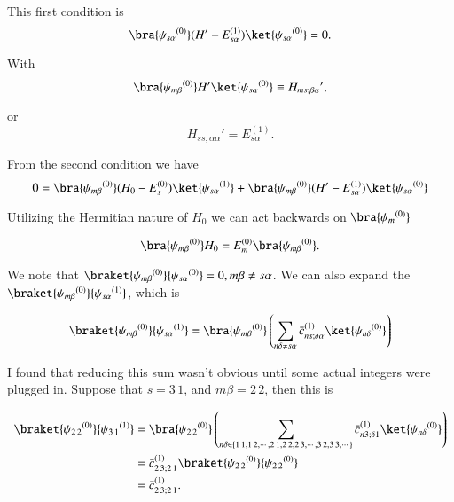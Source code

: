 This first condition is
\begin{equation}\label{eqn:qmTwoL5a:480}
\bra{{\psi_{s \alpha}}^{(0)}} (H' - E_{s \alpha}^{(1)}) \ket{{\psi_{s \alpha}}^{(0)}} = 0.
\end{equation}

With
\begin{equation}\label{eqn:qmTwoL5a:500}
\bra{{\psi_{m \beta}}^{(0)}} H' \ket{{\psi_{s \alpha}}^{(0)}} \equiv {H_{ms ; \beta \alpha}}',
\end{equation}

or
\begin{equation}\label{eqn:qmTwoL5a:520}
{H_{ss ; \alpha \alpha}}' = E_{s \alpha}^{(1)}.
\end{equation}

From the second condition we have
\begin{equation}\label{eqn:qmTwoL5a:540}
0 = \bra{{\psi_{m \beta}}^{(0)}} 
(H_0 - E_s^{(0)}) \ket{{\psi_{s \alpha}}^{(1)}} 
+\bra{{\psi_{m \beta}}^{(0)}} 
(H' - E_{s \alpha}^{(1)}) \ket{{\psi_{s \alpha}}^{(0)}} 
\end{equation}

Utilizing the Hermitian nature of $H_0$ we can act backwards on $\bra{{\psi_m}^{(0)}}$ 

\begin{equation}\label{eqn:qmTwoL5a:560}
\bra{{\psi_{m \beta}}^{(0)}} H_0
=
E_m^{(0)} \bra{{\psi_{m \beta}}^{(0)}}.
\end{equation}

We note that $\braket{{\psi_{m \beta}}^{(0)}}{{\psi_{s \alpha}}^{(0)}} = 0, m \beta \ne s \alpha$.  We can also expand the $\braket{{\psi_{m \beta}}^{(0)}}{{\psi_{s \alpha}}^{(1)}}$, which is

\begin{align*}
\braket{{\psi_{m \beta}}^{(0)}}{{\psi_{s \alpha}}^{(1)}} 
&=
\bra{{\psi_{m \beta}}^{(0)}}
\left(
\sum_{n\delta \ne s\alpha} {\bar{c}_{ns;\delta \alpha}}^{(1)} \ket{{\psi_{n \delta}}^{(0)}}
\right) \\
\end{align*}

I found that reducing this sum wasn't obvious until some actual integers were plugged in.  Suppose that $s = 3\,1$, and $m \beta = 2\,2$, then this is

\begin{align*}
\braket{{\psi_{2\,2}}^{(0)}}{{\psi_{3\,1}}^{(1)}} 
&=
\bra{{\psi_{2\,2}}^{(0)}}
\left(
\sum_{n \delta \in \{1\,1, 1\,2, \cdots, 2\,1, 2\,2, 2\,3, \cdots, 3\,2, 3\,3, \cdots \} } {\bar{c}_{n 3; \delta 1}}^{(1)} \ket{{\psi_{n \delta}}^{(0)}}
\right) \\
&=
{\bar{c}_{2\,3 ; 2\,1}}^{(1)} \braket{{\psi_{2\,2}}^{(0)}}{{\psi_{2\,2}}^{(0)}} \\
&=
{\bar{c}_{2\,3; 2\,1}}^{(1)}.
\end{align*}

